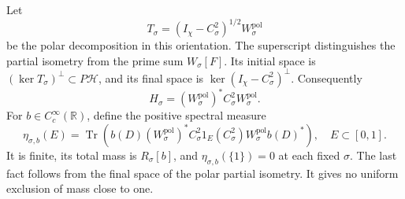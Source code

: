 \documentclass[11pt]{article}
\numberwithin{equation}{section}
\theoremstyle{definition}
\theoremstyle{remark}
\newcommand{\HH}{\mathcal H}
\newcommand{\Tr}{\operatorname{Tr}}
\newcommand{\Id}{I}
\begin{document}
Let
\begin{equation}\label{eq:polar}
T_\sigma=(\Id_\chi-C_\sigma^2)^{1/2}W_\sigma^{\mathrm{pol}}
\end{equation}
be the polar decomposition in this orientation.
The superscript distinguishes the partial isometry from the prime sum
\(W_\sigma[F]\). Its initial space is
\((\ker T_\sigma)^\perp\subset P\HH\), and its final space is
\(\ker(\Id_\chi-C_\sigma^2)^\perp\).
Consequently
\begin{equation}\label{eq:Hpolar}
H_\sigma=(W_\sigma^{\mathrm{pol}})^*C_\sigma^2
W_\sigma^{\mathrm{pol}}.
\end{equation}
For \(b\in C_c^\infty(\mathbb R)\), define the positive spectral measure
\begin{equation}\label{eq:eta}
\eta_{\sigma,b}(E)=
\Tr\!\left(b(D)(W_\sigma^{\mathrm{pol}})^*C_\sigma^2
1_E(C_\sigma^2)W_\sigma^{\mathrm{pol}}b(D)^*\right),
\quad E\subset[0,1].
\end{equation}
It is finite, its total mass is \(R_\sigma[b]\), and
\(\eta_{\sigma,b}(\{1\})=0\) at each fixed \(\sigma\).
The last fact follows from the final space of the polar partial
isometry. It gives no uniform exclusion of mass close to one.
\end{document}
